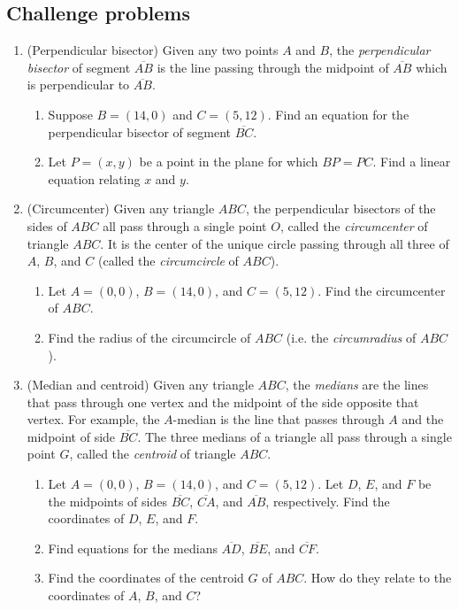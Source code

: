 \subsection{Challenge problems}

\begin{enumerate}[resume]
\item (Perpendicular bisector) Given any two points $A$ and $B$, the \emph{perpendicular bisector} of segment $\overline{AB}$ is the line passing through the midpoint of $\overline{AB}$ which is perpendicular to $\overline{AB}$.
\begin{enumerate}
\item Suppose $B = (14,0)$ and $C = (5,12)$. Find an equation for the perpendicular bisector of segment $\overline{BC}$.
\item Let $P = (x,y)$ be a point in the plane for which $BP = PC$. Find a linear equation relating $x$ and $y$.
\end{enumerate}
\item (Circumcenter) Given any triangle $ABC$, the perpendicular bisectors of the sides of $ABC$ all pass through a single point $O$, called the \emph{circumcenter} of triangle $ABC$. It is the center of the unique circle passing through all three of $A$, $B$, and $C$ (called the \emph{circumcircle} of $ABC$).
\begin{enumerate}
\item Let $A = (0,0)$, $B = (14,0)$, and $C = (5,12)$. Find the circumcenter of $ABC$.
\item Find the radius of the circumcircle of $ABC$ (i.e. the \emph{circumradius} of $ABC$).
\end{enumerate}
\item (Median and centroid) Given any triangle $ABC$, the \emph{medians} are the lines that pass through one vertex and the midpoint of the side opposite that vertex. For example, the $A$-median is the line that passes through $A$ and the midpoint of side $\overline{BC}$. The three medians of a triangle all pass through a single point $G$, called the \emph{centroid} of triangle $ABC$.
\begin{enumerate}
\item Let $A = (0,0)$, $B = (14,0)$, and $C = (5,12)$. Let $D$, $E$, and $F$ be the midpoints of sides $\overline{BC}$, $\overline{CA}$, and $\overline{AB}$, respectively. Find the coordinates of $D$, $E$, and $F$.
\item Find equations for the medians $\overline{AD}$, $\overline{BE}$, and $\overline{CF}$.
\item Find the coordinates of the centroid $G$ of $ABC$. How do they relate to the coordinates of $A$, $B$, and $C$?

\end{enumerate}
\end{enumerate}
